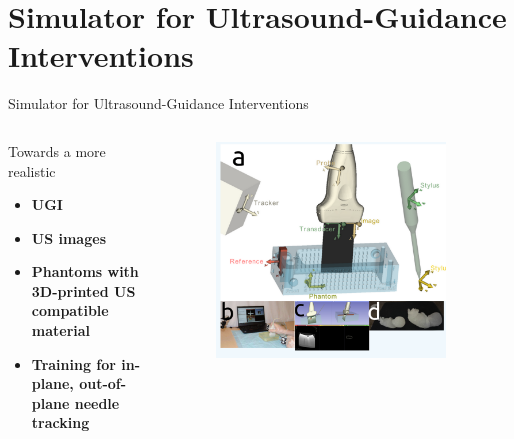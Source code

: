 \section{Simulator for Ultrasound-Guidance Interventions}

{
\begin{frame}{Simulator for Ultrasound-Guidance Interventions}

  \begin{columns}
    \begin{column}{.3\linewidth}
      Towards a more realistic
  \begin{itemize}
    \item \textbf{UGI}
    \item \textbf{US images}
    \item \textbf{Phantoms with 3D-printed US compatible material}
    \item \textbf{Training for in-plane, out-of-plane needle tracking}
  \end{itemize}

    \end{column}


  \begin{column}{.6\linewidth}

      \begin{figure}
        \centering
        \includegraphics[width=0.9\textwidth]{./figures/simulator-for-ugi/versions/drawing-v01.png}
      \end{figure}

    \end{column}
  \end{columns}


\end{frame}
}
